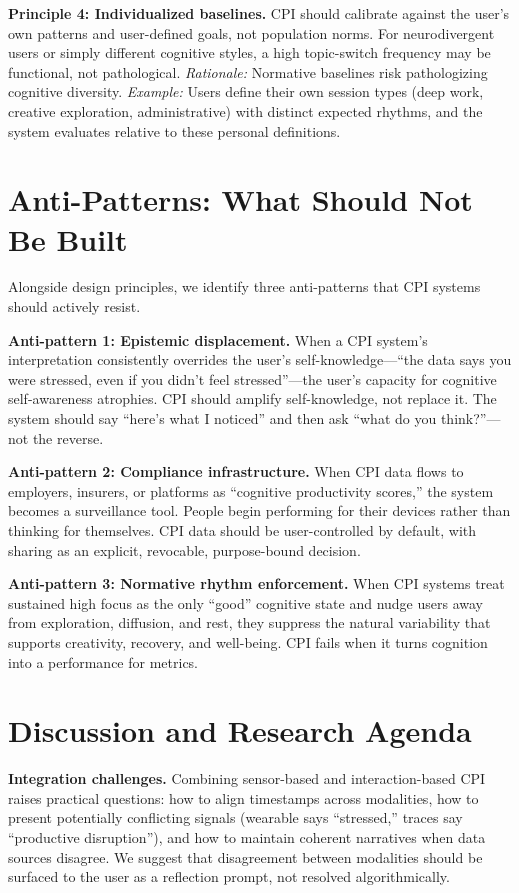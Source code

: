 \documentclass[10pt]{article}
\begin{document}
\textbf{Principle 4: Individualized baselines.} CPI should calibrate against the user's own patterns and user-defined goals, not population norms. For neurodivergent users or simply different cognitive styles, a high topic-switch frequency may be functional, not pathological. \textit{Rationale:} Normative baselines risk pathologizing cognitive diversity. \textit{Example:} Users define their own session types (deep work, creative exploration, administrative) with distinct expected rhythms, and the system evaluates relative to these personal definitions.

\section{Anti-Patterns: What Should Not Be Built}

Alongside design principles, we identify three anti-patterns that CPI systems should actively resist.

\textbf{Anti-pattern 1: Epistemic displacement.} When a CPI system's interpretation consistently overrides the user's self-knowledge---``the data says you were stressed, even if you didn't feel stressed''---the user's capacity for cognitive self-awareness atrophies. CPI should amplify self-knowledge, not replace it. The system should say ``here's what I noticed'' and then ask ``what do you think?''---not the reverse.

\textbf{Anti-pattern 2: Compliance infrastructure.} When CPI data flows to employers, insurers, or platforms as ``cognitive productivity scores,'' the system becomes a surveillance tool. People begin performing for their devices rather than thinking for themselves. CPI data should be user-controlled by default, with sharing as an explicit, revocable, purpose-bound decision.

\textbf{Anti-pattern 3: Normative rhythm enforcement.} When CPI systems treat sustained high focus as the only ``good'' cognitive state and nudge users away from exploration, diffusion, and rest, they suppress the natural variability that supports creativity, recovery, and well-being. CPI fails when it turns cognition into a performance for metrics.

\section{Discussion and Research Agenda}

\textbf{Integration challenges.} Combining sensor-based and interaction-based CPI raises practical questions: how to align timestamps across modalities, how to present potentially conflicting signals (wearable says ``stressed,'' traces say ``productive disruption''), and how to maintain coherent narratives when data sources disagree. We suggest that disagreement between modalities should be surfaced to the user as a reflection prompt, not resolved algorithmically.
\end{document}
